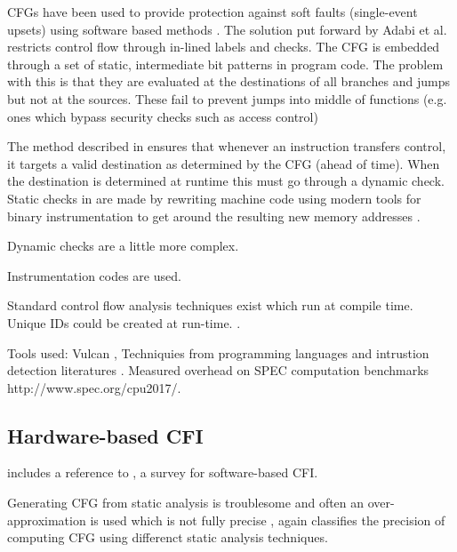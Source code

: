 CFGs have been used to provide protection against soft faults (single-event upsets) using software based methods \cite{Oh2002} \cite{Sharma2012} \cite{Venkatasubramanian2003}. 
The solution put forward by Adabi et al. \cite{Abadi2005} restricts control flow through in-lined labels and checks. The CFG is embedded through a set of static, intermediate bit patterns in program code. The problem with this is that they are evaluated at the destinations of all branches and jumps but not at the sources. These fail to prevent jumps into middle of functions (e.g. ones which bypass security checks such as access control)

The method described in \cite{Abadi2005} ensures that whenever an instruction transfers control, it targets a valid destination as determined by the CFG (ahead of time). When the destination is determined at runtime this must go through a dynamic check. Static checks in \cite{Abadi2005} are made by rewriting machine code using modern tools for binary instrumentation to get around the resulting new memory addresses \cite{Edwards2001} \cite{Srivastava1994}.

Dynamic checks are a little more complex.  

Instrumentation codes are used. 

Standard control flow analysis techniques exist \cite{AhoAlfredV.2014C:pt} \cite{Atkinson} \cite{Wagner2002} which run at compile time. Unique IDs could be created at run-time. .

Tools used: Vulcan \cite{Edwards2001}, Techniquies from programming languages and intrustion detection literatures \cite{AhoAlfredV.2014C:pt} \cite{Feng2003} \cite{Gopalakrishna2005} \cite{Wagner2002}. Measured overhead on SPEC computation benchmarks http://www.spec.org/cpu2017/.

\subsection{Hardware-based CFI}

\cite{DeClercq2017} includes a reference to \cite{Burow} , a survey for software-based CFI.

Generating CFG from static analysis is troublesome and often an over-approximation is used which is not fully precise \cite{Carlini2015} \cite{Kinder2012}, again \cite{Burow} classifies the precision of computing CFG using differenct static analysis techniques.

